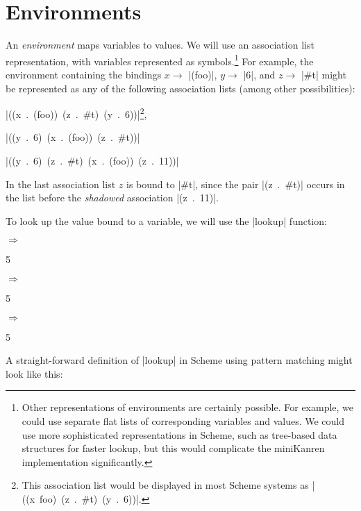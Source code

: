 \chapter{Environments}

An \emph{environment} maps variables to values.
%
We will use an association list representation, with variables
represented as symbols.\footnote{Other representations of environments
  are certainly possible.  For example, we could use separate flat
  lists of corresponding variables and values.  We could use more
  sophisticated representations in Scheme, such as tree-based data
  structures for faster lookup, but this would complicate the
  miniKanren implementation significantly.}
For example, the environment containing the bindings
%
$x \rightarrow$ \schemeresult|(foo)|,
%
$y \rightarrow$ \schemeresult|6|,
%
and 
%
$z \rightarrow$ \schemeresult|#t|
%
might be represented as any of the following association lists (among other possibilities):

\noindent\mbox{\schemeresult|((x . (foo)) (z . #t) (y . 6))|}\footnote{This association list would be displayed in most Scheme systems as \mbox{\schemeresult|((x foo) (z . #t) (y . 6))|}.},

\noindent\mbox{\schemeresult|((y . 6) (x . (foo)) (z . #t))|}

\noindent\mbox{\schemeresult|((y . 6) (z . #t) (x . (foo)) (z . 11))|}

\noindent
In the last association list $z$ is bound to \schemeresult|#t|, since the pair \mbox{\schemeresult|(z . #t)|}
occurs in the list before the \emph{shadowed} association \mbox{\schemeresult|(z . 11)|}.

To look up the value bound to a variable, we will use the \scheme|lookup| function:

\noindent{} $\Rightarrow$
\begin{schemeresponsebox}5\end{schemeresponsebox}

\noindent{} $\Rightarrow$
\begin{schemeresponsebox}5\end{schemeresponsebox}

\noindent{} $\Rightarrow$
\begin{schemeresponsebox}5\end{schemeresponsebox}

A straight-forward definition of \scheme|lookup| in Scheme using
pattern matching might look like this:

